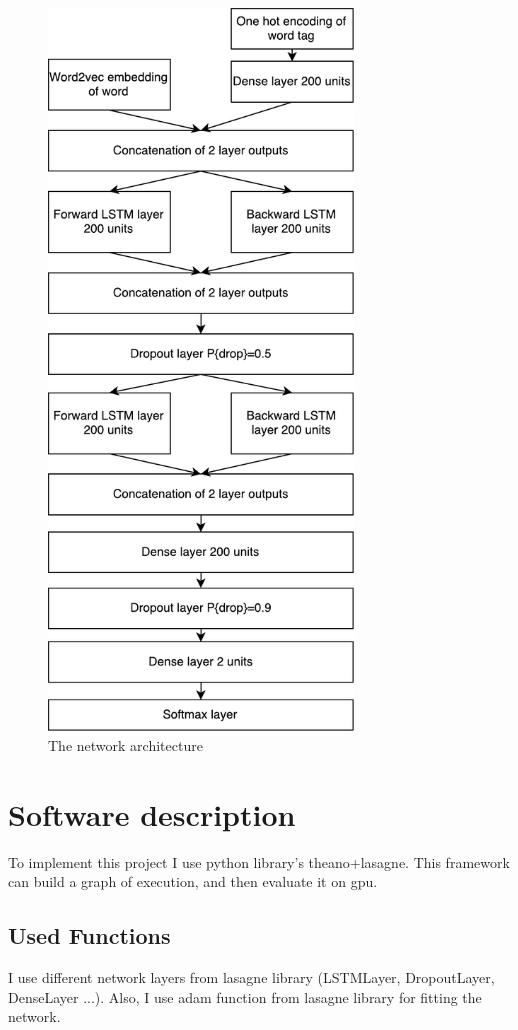 \documentclass[a4paper,12pt,oneside]{article}
\begin{document}
\begin{figure}[t]%
	\centering
	\includegraphics[width=230pt]{compression_network}
	\caption{The network architecture}%
	\label{fig:network}%
\end{figure}


\section{Software description}
To implement this project I use python library's theano+lasagne. This framework can build a graph of execution, and then evaluate it on gpu.

\subsection{Used Functions}
I use different network layers from lasagne library (LSTMLayer, DropoutLayer, DenseLayer ...). Also, I use adam function from lasagne library for fitting the network.
\end{document}

